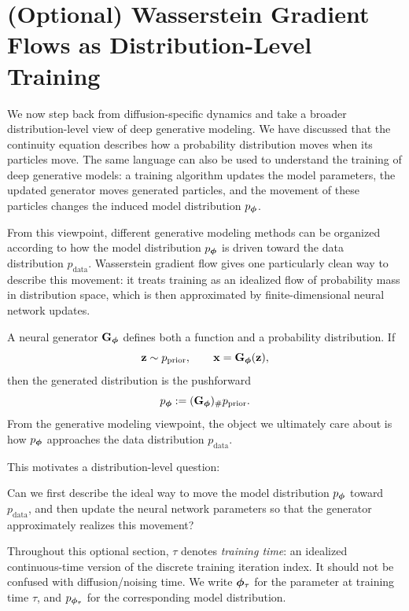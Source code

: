 \clearpage
\newpage

\section{(Optional) Wasserstein Gradient Flows as Distribution-Level Training}
\label{sec:wgf-distribution-level-training}

We now step back from diffusion-specific dynamics and take a broader
distribution-level view of deep generative modeling.  We have discussed that the continuity equation describes how a probability
distribution moves when its particles move.   The same language can also be used
to understand the training of deep generative models: a training algorithm updates
the model parameters, the updated generator moves generated particles, and the
movement of these particles changes the induced model distribution
$p_{{\bm{\phi}}}$.

From this viewpoint, different generative modeling methods can be organized
according to how the model distribution $p_{{\bm{\phi}}}$ is driven toward the data
distribution $p_{\mathrm{data}}$.  Wasserstein gradient flow gives one
particularly clean way to describe this movement: it treats training as an
idealized flow of probability mass in distribution space, which is then
approximated by finite-dimensional neural network updates.


A neural generator ${\mathbf{G}}_{{\bm{\phi}}}$ defines both a function and a probability
distribution.  If
\[
    {\mathbf{z}}\sim p_{\mathrm{prior}},
    \qquad
    {\mathbf{x}}={\mathbf{G}}_{{\bm{\phi}}}({\mathbf{z}}),
\]
then the generated distribution is the pushforward
\[
    p_{{\bm{\phi}}}:=({\mathbf{G}}_{{\bm{\phi}}})_\# p_{\mathrm{prior}}.
\]
From the generative modeling viewpoint, the object we ultimately care about is
how $p_{{\bm{\phi}}}$ approaches the data distribution $p_{\mathrm{data}}$.

This motivates a distribution-level question:
\begin{question}
Can we first describe the ideal way to move the model distribution
$p_{{\bm{\phi}}}$ toward $p_{\mathrm{data}}$, and then update the neural network
parameters so that the generator approximately realizes this movement?
\end{question}

Throughout this optional section, $\tau$ denotes \emph{training time}: an
idealized continuous-time version of the discrete training iteration index.  It
should not be confused with diffusion/noising time.  We write ${\bm{\phi}}_\tau$ for
the parameter at training time $\tau$, and $p_{{\bm{\phi}}_\tau}$ for the
corresponding model distribution.

